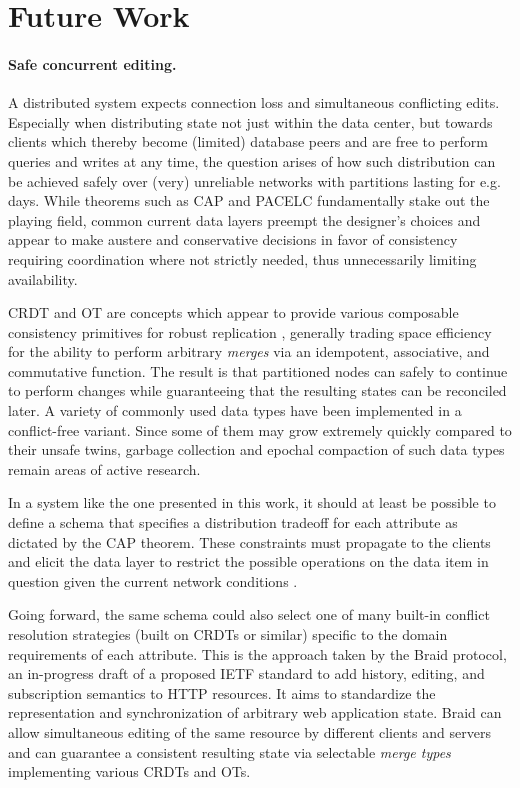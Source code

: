 \cleardoublepage
\section{Future Work}

\paragraph{Safe concurrent editing.}
A distributed system expects connection loss and simultaneous conflicting edits. Especially when distributing state not just within the data center, but towards clients which thereby become (limited) database peers and are free to perform queries and writes at any time, the question arises of how such distribution can be achieved safely over (very) unreliable networks with partitions lasting for e.g. days. While theorems such as CAP and PACELC fundamentally stake out the playing field, common current data layers preempt the designer's choices and appear to make austere and conservative decisions in favor of consistency requiring coordination where not strictly needed, thus unnecessarily limiting availability.

\gls{CRDT} and \gls{OT} are concepts which appear to provide various composable consistency primitives for robust replication \cite{weilbach2015replikativ, weilbach2016decoupling}, generally trading space efficiency for the ability to perform arbitrary \emph{merges} via an idempotent, associative, and commutative function. The result is that partitioned nodes can safely to continue to perform changes while guaranteeing that the resulting states can be reconciled later. A variety of commonly used data types have been implemented in a conflict-free variant. Since some of them may grow extremely quickly compared to their unsafe twins, garbage collection and epochal compaction of such data types remain areas of active research.

In a system like the one presented in this work, it should at least be possible to define a schema that specifies a distribution tradeoff for each attribute as dictated by the \gls{CAP} theorem. These constraints must propagate to the clients and elicit the data layer to restrict the possible operations on the data item in question given the current network conditions \cite{emerick2014api}.

Going forward, the same schema could also select one of many built-in conflict resolution strategies (built on CRDTs or similar) specific to the domain requirements of each attribute. This is the approach taken by the Braid \cite{braid19} protocol, an in-progress draft of a proposed \gls{IETF} standard to add history, editing, and subscription semantics to HTTP resources. It aims to standardize the representation and synchronization of arbitrary web application state. Braid can allow simultaneous editing of the same resource by different clients and servers and can guarantee a consistent resulting state via selectable \emph{merge types} implementing various CRDTs and OTs.

